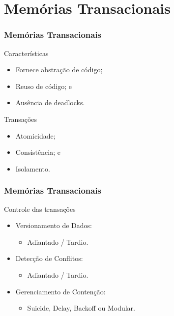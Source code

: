 \documentclass[10pt, pdf,xcolor=pdftex,dvipsnames,table]{beamer}
\begin{document}
\section{Memórias Transacionais}

\begin{frame} \frametitle{Memórias Transacionais}
    \begin{block}{Características}
        \begin{itemize}
        	\item Fornece abstração de código;
        	\item Reuso de código; e
        	\item Ausência de deadlocks.
        \end{itemize}
    \end{block}
    
    \begin{block}{Transações}
        \begin{itemize}
        	\item Atomicidade;
        	\item Consistência; e
        	\item Isolamento.
        \end{itemize}
    \end{block}
\end{frame}

\begin{frame} \frametitle{Memórias Transacionais}
    \begin{block}{Controle das transações}
        \begin{itemize}
    		\item Versionamento de Dados:
    		\begin{itemize}
    			\item Adiantado / Tardio.
    		\end{itemize}
    		\item Detecção de Conflitos:
    		\begin{itemize}
    			\item Adiantado / Tardio.
    		\end{itemize}
    		\item Gerenciamento de Contenção:
        		\begin{itemize}
        		    \item Suicide, Delay, Backoff ou Modular.
        		\end{itemize}
        \end{itemize}
    \end{block}
\end{frame}
\end{document}
